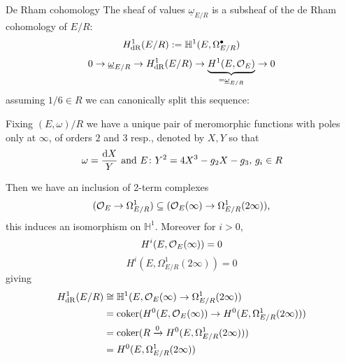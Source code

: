\begin{frame}{De Rham cohomology}
    The sheaf of values $\underline \omega_{E/R}$ is a subsheaf of the de Rham cohomology of $E/R$:
    \[H_{\mathrm{dR}}^1(E/R) := \mathbb H^1(E, \Omega^\bullet_{E/R}) \]
    \[0\to \underline \omega_{E/R} \to H^1_{\mathrm{dR}}(E/R) \to \underbrace{ H^1 (E, \operatorname{\mathcal{O}}_E)}_{=\underline \omega_{E/R}} \to 0\]\pause
    assuming $1/6\in R$ we can canonically split this sequence:\pause

    Fixing $(E, \omega)/R$ we have a unique pair of meromorphic functions with poles only at $\infty$, of orders $2$ and $3$ resp., denoted by $X,Y$ so that
    \[ \omega = \frac{\mathop{}\!\mathrm{d} X }{Y}\text{ and } E \colon Y^2 = 4X^3  - g_2X - g_3,\,g_i\in R\]
\end{frame}

\begin{frame}
    Then we have an inclusion of 2-term complexes
    \[
        (\operatorname{\mathcal{O}}_E \to \Omega_{E/R}^1) \subseteq (\operatorname{\mathcal{O}}_{E}(\infty) \to  \Omega_{E/R}^1 (2\infty))\text,
    \]\pause
    this induces an isomorphism on $\mathbb H^1$.
    Moreover for $i\gt0$,
    \[ H^i(E, \operatorname{\mathcal{O}}_E(\infty)) = 0 \]
    \[ H^i(E, \Omega^1_{E/R}(2\infty)) = 0 \]
    giving
    \begin{align*}
        H^1_{\mathrm{dR}}(E/R) &\cong \mathbb H^1(E, \operatorname{\mathcal{O}}_E(\infty) \to  \Omega^1_{E/R}(2\infty))\\
          &= \operatorname{coker}( H^0(E, \operatorname{\mathcal{O}}_E(\infty)) \to H^0(E, \Omega^1_{E/R}(2\infty)))\\
                                                                        &= \operatorname{coker}( R \xrightarrow 0  H^0(E, \Omega^1_{E/R}(2\infty)))        \\
                                                                        &= H^0(E, \Omega^1_{E/R}(2\infty))
    \end{align*}
\end{frame}

\begin{frame}
\end{frame}

\begin{frame}
\end{frame}

\begin{frame}

\begin{theorem}
\end{theorem}

\end{frame}



